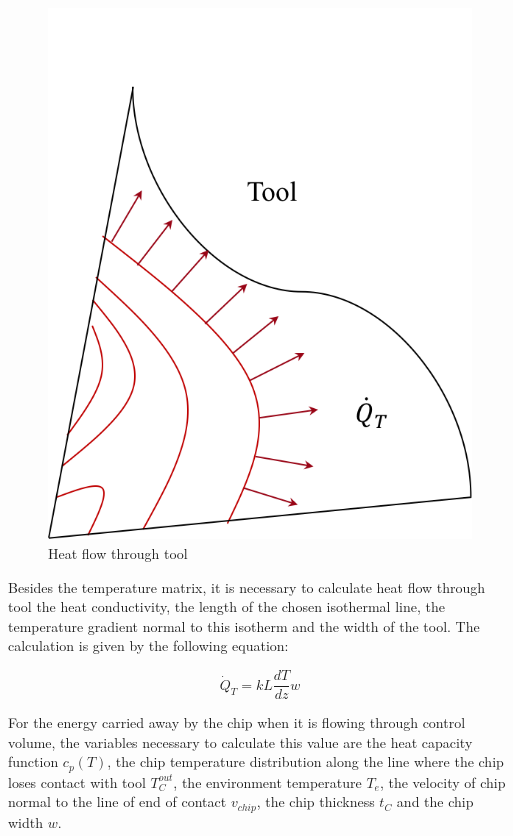 	\begin{figure}[H]
		\centering
		\captionsetup{justification=centering}
		\includegraphics[scale=0.6]{Cap4/ToolHeat.png}
		\caption{Heat flow through tool}
		\label{fig:heattool}
	\end{figure}

	Besides the temperature matrix, it is necessary to calculate heat flow through tool the heat conductivity, the length of the chosen isothermal line, the temperature gradient normal to this isotherm and the width of the tool. The calculation is given by the following equation:

	\begin{equation} 
	\label{eq_heattool}
		\dot{Q}_{T} = kL\frac{dT}{dz}w
	\end{equation}

	For the energy carried away by the chip when it is flowing through control volume, the variables necessary to calculate this value are the heat capacity function $c_{p}(T)$, the chip temperature distribution along the line where the chip loses contact with tool $T_{C}^{out}$, the environment temperature $T_{e}$, the velocity of chip normal to the line of end of contact $v_{chip}$, the chip thickness $t_{C}$ and the chip width $w$.

